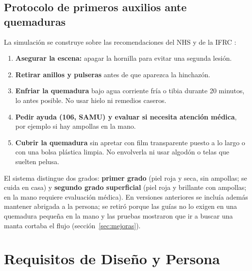 \documentclass[11pt,a4paper]{article}
\begin{document}
\subsection{Protocolo de primeros auxilios ante quemaduras}
\label{sec:protocolo}
La simulación se construye sobre las recomendaciones del NHS y de la IFRC \cite{nhs,ifrc}:
\begin{enumerate}
    \item \textbf{Asegurar la escena:} apagar la hornilla para evitar una segunda lesión.
    \item \textbf{Retirar anillos y pulseras} antes de que aparezca la hinchazón.
    \item \textbf{Enfriar la quemadura} bajo agua corriente fría o tibia durante 20 minutos, lo antes posible. No usar hielo ni remedios caseros.
    \item \textbf{Pedir ayuda (106, SAMU) y evaluar si necesita atención médica}, por ejemplo si hay ampollas en la mano.
    \item \textbf{Cubrir la quemadura} sin apretar con film transparente puesto a lo largo o con una bolsa plástica limpia. No envolverla ni usar algodón o telas que suelten pelusa.
\end{enumerate}
El sistema distingue dos grados: \textbf{primer grado} (piel roja y seca, sin ampollas; se cuida en casa) y \textbf{segundo grado superficial} (piel roja y brillante con ampollas; en la mano requiere evaluación médica). En versiones anteriores se incluía además mantener abrigada a la persona; se retiró porque las guías no lo exigen en una quemadura pequeña en la mano y las pruebas mostraron que ir a buscar una manta cortaba el flujo (sección~\ref{sec:mejoras}).

\section{Requisitos de Diseño y Persona}
\end{document}
